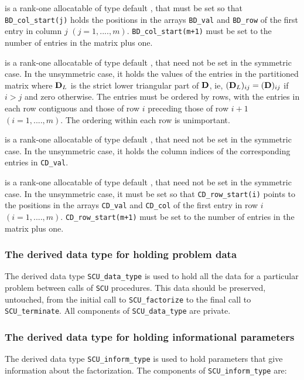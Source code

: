 \documentclass{galahad}
\newcommand{\packagename}{SCU}
\begin{document}
\begin{description}
 is a rank-one allocatable of type default \integer, that
must be set so that {\tt BD\_col\_start(j)} holds the positions
in the arrays {\tt BD\_val} and {\tt BD\_row} of the first entry in column $j$
$(j = 1, ...., m)$. {\tt BD\_col\_start(m+1)} must be set to
the number of entries in the matrix  plus one.

 is a rank-one allocatable of type default
\realdp, that need not be
set in the symmetric case. In the unsymmetric case, it
holds the values of the entries in the partitioned matrix
where ${\mathbf{D}}_L$ is the strict lower triangular part of ${\mathbf{D}}$, ie,
$( {\mathbf{D}}_L )_{ij}  =  ( {\mathbf{D}} )_{ij} $ if $i  >  j$ and zero
otherwise.
The entries must be ordered by rows, with the entries in each row
contiguous and those of row
$i$ preceding those of row $i+1$ $(i = 1, ...., m)$.
The ordering within each row is unimportant.

 is a rank-one allocatable of type default \integer,
that need not be set in the symmetric case. In the unsymmetric case, it holds
the column indices of the corresponding entries in {\tt CD\_val}.

 is a rank-one allocatable of type default \integer,
that need not be set in the symmetric case. In the unsymmetric case, it
must be set so that {\tt CD\_row\_start(i)} points to the
positions in the arrays {\tt CD\_val} and {\tt CD\_col} of the first entry in
row $i$ $(i = 1, ...., m)$. {\tt CD\_row\_start(m+1)} must be set to
the number of entries in the matrix  plus one.

\end{description}


\subsubsection{The derived data type for holding problem data}\label{typedata}
The derived data type
{\tt \packagename\_data\_type}
is used to hold all the data for a particular problem between calls of
{\tt \packagename} procedures.
This data should be preserved, untouched, from the initial call to
{\tt \packagename\_factorize}
to the final call to
{\tt \packagename\_terminate}.
All components of {\tt \packagename\_data\_type} are private.


\subsubsection{The derived data type for holding informational
 parameters}\label{typeinfo}
The derived data type
{\tt \packagename\_inform\_type}
is used to hold parameters that give information about the factorization.
The components of
{\tt \packagename\_inform\_type}
are:
\end{document}
